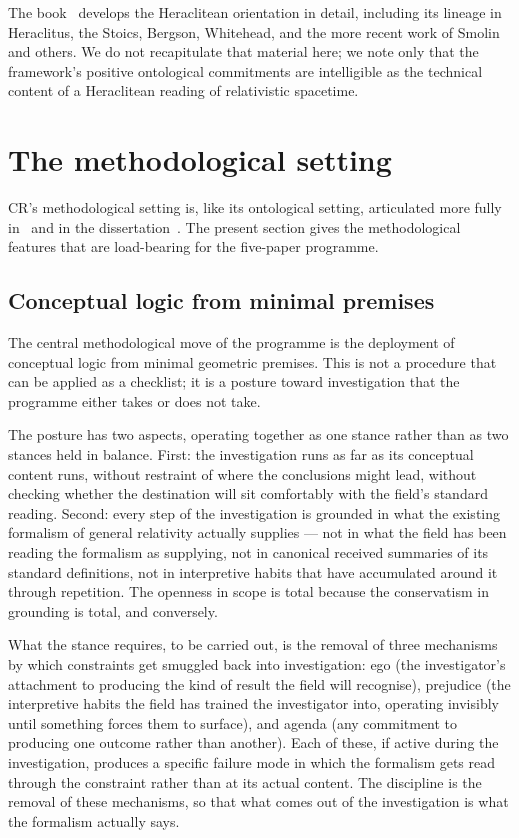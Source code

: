 \documentclass[11pt,a4paper]{article}
\theoremstyle{definition}
\begin{document}
The book~\cite{Janzen2025} develops the Heraclitean orientation in detail, including its lineage in Heraclitus, the Stoics, Bergson, Whitehead, and the more recent work of Smolin and others. We do not recapitulate that material here; we note only that the framework's positive ontological commitments are intelligible as the technical content of a Heraclitean reading of relativistic spacetime.

\section{The methodological setting}\label{sec:methodology}

CR's methodological setting is, like its ontological setting, articulated more fully in~\cite{Janzen2025} and in the dissertation~\cite{Janzen2012}. The present section gives the methodological features that are load-bearing for the five-paper programme.

\subsection{Conceptual logic from minimal premises}\label{sec:conceptual-logic}

The central methodological move of the programme is the deployment of conceptual logic from minimal geometric premises. This is not a procedure that can be applied as a checklist; it is a posture toward investigation that the programme either takes or does not take.

The posture has two aspects, operating together as one stance rather than as two stances held in balance. First: the investigation runs as far as its conceptual content runs, without restraint of where the conclusions might lead, without checking whether the destination will sit comfortably with the field's standard reading. Second: every step of the investigation is grounded in what the existing formalism of general relativity actually supplies --- not in what the field has been reading the formalism as supplying, not in canonical received summaries of its standard definitions, not in interpretive habits that have accumulated around it through repetition. The openness in scope is total because the conservatism in grounding is total, and conversely.

What the stance requires, to be carried out, is the removal of three mechanisms by which constraints get smuggled back into investigation: ego (the investigator's attachment to producing the kind of result the field will recognise), prejudice (the interpretive habits the field has trained the investigator into, operating invisibly until something forces them to surface), and agenda (any commitment to producing one outcome rather than another). Each of these, if active during the investigation, produces a specific failure mode in which the formalism gets read through the constraint rather than at its actual content. The discipline is the removal of these mechanisms, so that what comes out of the investigation is what the formalism actually says.
\end{document}
